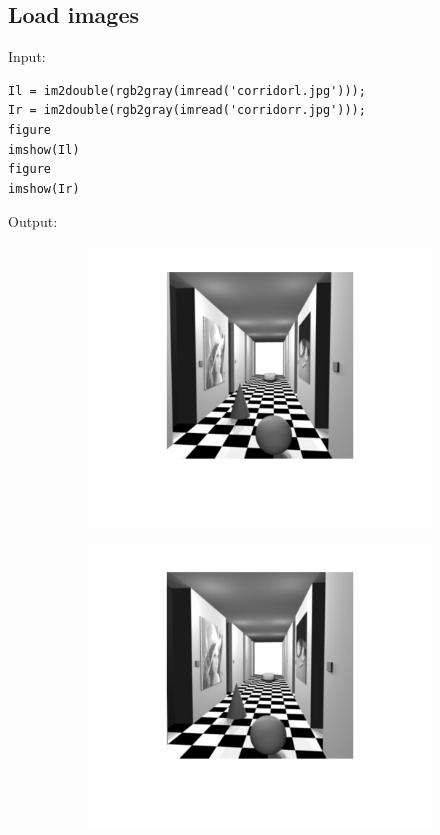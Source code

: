 \documentclass[12pt, a4paper]{article}
\begin{document}
\subsection{Load images}
Input:
\begin{verbatim}
Il = im2double(rgb2gray(imread('corridorl.jpg')));
Ir = im2double(rgb2gray(imread('corridorr.jpg')));
figure
imshow(Il)
figure
imshow(Ir)
\end{verbatim}
Output:
\vspace{-4mm}
\begin{figure}[H]
    \centering %
    \begin{subfigure}[b]{0.45\textwidth}
        \includegraphics[width=\textwidth]{fig17.png}
    \end{subfigure}
    \begin{subfigure}[b]{0.45\textwidth}
        \includegraphics[width=\textwidth]{fig18.png}
    \end{subfigure}
\end{figure}
\end{document}
